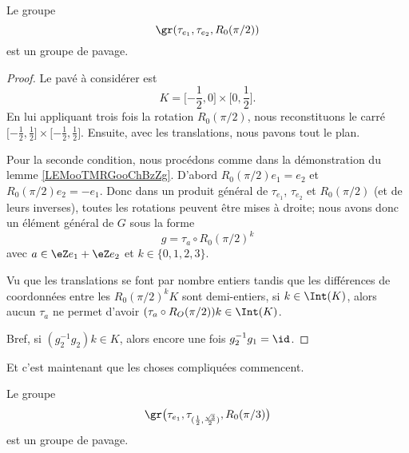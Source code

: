 \newcommand{\CaptionFigATJSooefYkmCbP}{Le compact \( K\) et son image par \( R_0(\pi)\) pour le lemme \ref{LEMooTMRGooChBzZg}.}


\begin{lemma}    
    Le groupe
    \begin{equation}
        \gr(\tau_{e_1}, \tau_{e_2}, R_0(\pi/2))
    \end{equation}
    est un groupe de pavage.
\end{lemma}

\begin{proof}
    Le pavé à considérer est
    \begin{equation}
        K=\mathopen[ -\frac{ 1 }{2} , 0 \mathclose]\times \mathopen[ 0 , \frac{ 1 }{2} \mathclose].
    \end{equation}
    En lui appliquant trois fois la rotation \( R_0(\pi/2)\), nous reconstituons le carré \( \mathopen[ -\frac{ 1 }{2} , \frac{ 1 }{2} \mathclose]\times \mathopen[ -\frac{ 1 }{2} , \frac{ 1 }{2} \mathclose]\). Ensuite, avec les translations, nous pavons tout le plan.

    Pour la seconde condition, nous procédons comme dans la démonstration du lemme \ref{LEMooTMRGooChBzZg}. D'abord \( R_0(\pi/2)e_1=e_2\) et \( R_0(\pi/2)e_2=-e_1\). Donc dans un produit général de \( \tau_{e_1}\), \( \tau_{e_2}\) et \( R_0(\pi/2)\) (et de leurs inverses), toutes les rotations peuvent être mises à droite; nous avons donc un élément général de \( G\) sous la forme
    \begin{equation}
        g=\tau_a\circ R_0(\pi/2)^k
    \end{equation}
    avec \( a\in \eZ e_1+\eZ e_2\) et \( k\in \{ 0,1,2,3 \}\).
    
    Vu que les translations se font par nombre entiers tandis que les différences de coordonnées entre les \( R_0(\pi/2)^kK\) sont demi-entiers, si \( k\in \Int(K)\), alors aucun \( \tau_a\) ne permet d'avoir \( (\tau_a\circ R_O(\pi/2))k\in \Int(K)\).

    Bref, si \( (g_2^{-1}g_2)k\in K\), alors encore une fois \( g_2^{-1}g_1=\id\).
\end{proof}

Et c'est maintenant que les choses compliquées commencent.

\begin{lemma}
    Le groupe
    \begin{equation}
        \gr\big( \tau_{e_1},\tau_{(\frac{ 1 }{2},\frac{ \sqrt{ 3 } }{2})},R_0(\pi/3) \big)
    \end{equation}
    est un groupe de pavage.
\end{lemma}

